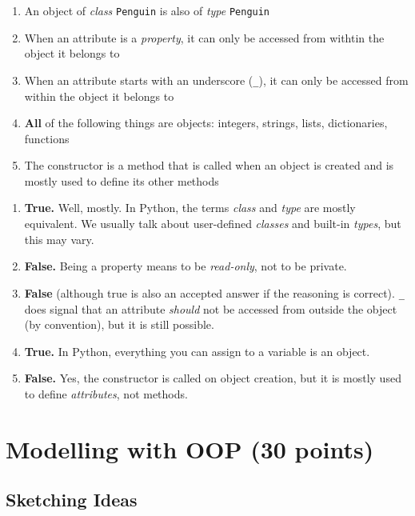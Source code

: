 \begin{enumerate}
    \item An object of {\it class} {\tt Penguin} is also of {\it type} {\tt Penguin}
    \item When an attribute is a {\it property}, it can only be accessed from withtin the object it belongs to
    \item When an attribute starts with an underscore ({\tt \_}), it can only be accessed from within the object it belongs to
    \item {\bf All} of the following things are objects: integers, strings, lists, dictionaries, functions
    \item The constructor is a method that is called when an object is created and is mostly used to define its other methods
\end{enumerate}

\begin{solution}
    \begin{enumerate}
        \item {\bf True.} Well, mostly. In Python, the terms {\it class} and {\it type} are mostly equivalent. We usually talk about user-defined {\it classes} and built-in {\it types}, but this may vary.
        \item {\bf False.} Being a property means to be {\it read-only}, not to be private.
        \item {\bf False} (although true is also an accepted answer if the reasoning is correct). {\tt \_} does signal that an attribute {\it should} not be accessed from outside the object (by convention), but it is still possible.
        \item {\bf True.} In Python, everything you can assign to a variable is an object.
        \item {\bf False.} Yes, the constructor is called on object creation, but it is mostly used to define {\it attributes}, not methods.
    \end{enumerate}
\end{solution}

\section{Modelling with OOP (30 points)}

\subsection{Sketching Ideas}


